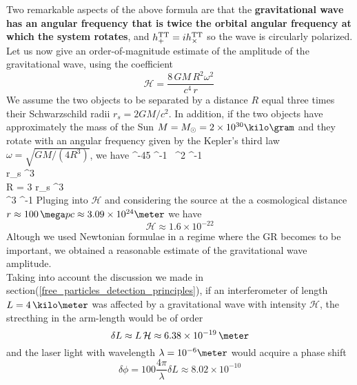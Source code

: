 Two remarkable aspects of the above formula are that the \textbf{gravitational wave has an angular frequency that is twice the orbital angular frequency at which the system rotates}, and $h_{+} ^{\text{TT}}= i h_{\times} ^{\text{TT}}$ so the wave is circularly polarized.\\
Let us now give an order-of-magnitude estimate of the amplitude of the gravitational wave, using the coefficient
\[
\mathcal{H} = 
 \dfrac{8\,G M \,R^{2} \omega^{2}}{c^{4}\, r} \,
\]
We assume the two objects to be separated by a distance $R$ equal three times their Schwarzschild radii $r_s=2 G M/c^{2}$.
In addition, if the two objects have approximately the mass of the Sun $M=M_{\odot}=2\times 10^{30} \kilo \gram $ and they rotate with an angular frequency given by the Kepler's third law $\omega = \sqrt{GM/(4R^{3})}$, we have
\bea
{}  ^{-45} \kilo \gram^{-1} \, \second ^{2} \meter ^{-1} 
\\
r_s ^{3} \, \meter
\\
R  = 3 r_s   ^{3} \, \meter
\\
\omega {}  ^{3} \second ^{-1}
\eea
Pluging into $\mathcal{H}$ and considering the source at the a cosmological distance $r\approx 100 \, \mega pc \approx 3.09 \times 10^{24} \meter$ we have
\[
\mathcal{H} \approx 1.6 \times 10^{-22}
\]
Altough we used Newtonian formulae in a regime where the GR becomes to be important, we obtained a reasonable estimate of the gravitational wave amplitude.\\
Taking into account the discussion we made in section(\ref{free_particles_detection_principles}), if an interferometer of length $L=4 \, \kilo \meter$ was affected by a gravitational wave with intensity $\mathcal{H}$, the strecthing in the arm-length would be of order
\[
\delta L \approx L \, \mathcal{H} \approx 6.38 \times 10^{-19} \, \meter
\]
and the laser light with wavelength $\lambda=10^{-6} \meter$ would acquire a phase shift
\[
\delta \phi = 100 \dfrac{4 \pi}{\lambda} \delta L\approx 8.02 \times 10 ^{-10}
\]
